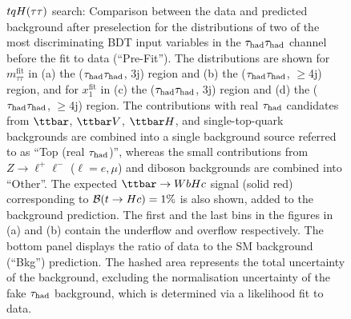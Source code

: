 \begin{figure}[t]
\begin{center}
\caption{$tqH(\tau\tau)$ search: Comparison between the data and predicted background after preselection for the distributions of two of the most 
discriminating BDT input variables in the $\tau_{\mathrm{had}} \tau_{\mathrm{had}}$ channel before the fit to data (``Pre-Fit''). The distributions are shown for
$m_{\tau\tau}^{\text{fit}}$ in (a) the ($\tau_{\mathrm{had}} \tau_{\mathrm{had}}$, 3j) region and (b) the ($\tau_{\mathrm{had}} \tau_{\mathrm{had}}$, $\geq$4j) region, and for
$x_{1}^{\text{fit}}$ in (c) the ($\tau_{\mathrm{had}} \tau_{\mathrm{had}}$, 3j)  region and (d) the ($\tau_{\mathrm{had}} \tau_{\mathrm{had}}$, $\geq$4j) region.
The contributions with real $\tau_{\mathrm{had}}$ candidates from $\ttbar$,  $\ttbar V$, $\ttbar H$, and single-top-quark backgrounds are combined into
a single background source referred to as ``Top (real $\tau_{\mathrm{had}}$)'', whereas the small contributions from 
$Z\to \ell^+\ell^-$ ($\ell = e, \mu$) and diboson backgrounds are combined into ``Other''. 
The expected $\Hc$ signal (solid red) corresponding to $\mathcal{B}(t\to Hc)=1\%$ is also shown,
added to the background prediction.
The first and the last bins in the figures in (a) and (b) contain the underflow and overflow respectively.
The bottom panel displays the ratio of data to the SM background (``Bkg'') prediction.
The hashed area represents the total uncertainty of the background, excluding the normalisation uncertainty of the fake $\tau_{\mathrm{had}}$ background, 
which is determined via a likelihood fit to data.} 
\label{fig:BDT_inputs_hadhad}
\end{center}
\end{figure}

